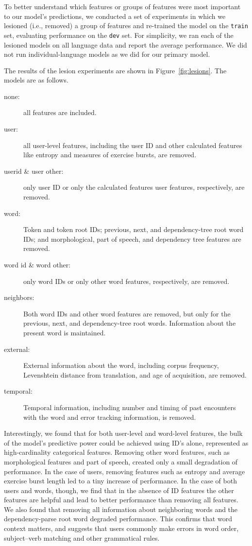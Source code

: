 \documentclass[11pt,a4paper]{article}
\begin{document}
To better understand which features or groups of features were most important to
our model's predictions, we conducted a set of experiments in which we lesioned
(i.e., removed) a group of features and re-trained the model on the {\tt train}
set, evaluating performance on the {\tt dev} set. For simplicity, we ran each of the
lesioned models on all language data and report the average
performance. We did not run individual-language models as we did for our primary model.

The results of the lesion experiments are shown in Figure~\ref{fig:lesions}. The
models are as follows.
\begin{description}
  \item[none:] all features are included.  
  \item[user:] all user-level features, including the user ID and other
    calculated features like entropy and measures of exercise bursts, are
    removed.
  \item[userid \& user other:] only user ID or only the calculated
    features user features, respectively, are removed.
  \item[word:] Token and token root IDs; previous, next, and dependency-tree
    root word IDs; and morphological, part of speech, and dependency tree
    features are removed.
  \item[word id \& word other:] only word IDs or only other
    word features, respectively, are removed.
  \item[neighbors:] Both word IDs and other word features are removed, but
    only for the previous, next, and dependency-tree root words. Information
    about the present word is maintained.
  \item[external:] External information about the word, including corpus
    frequency, Levenshtein distance from translation, and age of acquisition,
    are removed.
  \item[temporal:] Temporal information, including number and timing of
    past encounters with the word and error tracking information, is removed.
\end{description}

Interestingly, we found that for both user-level and word-level features, the
bulk of the model's predictive power could be achieved using ID's alone,
represented as high-cardinality categorical features. Removing other word features,
such as morphological features and part of speech, created only a small
degradation of performance. In the case of users, removing features such as
entropy and average exercise burst length led to a tiny increase of performance.
In the case of both users and words, though, we find that in the absence of ID
features the other features are helpful and lead to better performance than
removing all features. We also found that removing all information about
neighboring words and the dependency-parse root word degraded performance. This
confirms that word context matters, and suggests that users commonly make errors in word order,
subject--verb matching and other grammatical rules.
\end{document}
